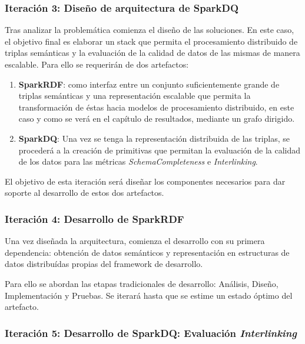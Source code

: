 

\subsubsection{Iteración 3: Diseño de arquitectura de SparkDQ}

Tras analizar la problemática comienza el diseño de las soluciones. En este
caso, el objetivo final es elaborar un stack que permita el procesamiento
distribuido de triplas semánticas y la evaluación de la calidad de datos de las
mismas de manera escalable. Para ello se requerirán de dos artefactos:

\begin{enumerate}
\item \textbf{SparkRDF}: como interfaz entre un conjunto suficientemente grande de
  triplas semánticas y una representación escalable que permita la
  transformación de éstas hacia modelos de procesamiento distribuido, en este
  caso y como se verá en el capítulo de resultados, mediante un grafo dirigido.
\item \textbf{SparkDQ}: Una vez se tenga la representación distribuida de las triplas, se
  procederá a la creación de primitivas que permitan la evaluación de la calidad
  de los datos para las métricas \textit{SchemaCompleteness} e \textit{Interlinking}.
\end{enumerate}


El objetivo de esta iteración será diseñar los componentes necesarios para dar
soporte al desarrollo de estos dos artefactos.



\subsubsection{Iteración 4: Desarrollo de SparkRDF}

Una vez diseñada la arquitectura, comienza el desarrollo con su primera
dependencia: obtención de datos semánticos y representación en estructuras de
datos distribuídas propias del framework de desarrollo.

Para ello se abordan las etapas tradicionales de desarrollo: Análisis, Diseño,
Implementación y Pruebas. Se iterará hasta que se estime un estado óptimo del
artefacto. 



\subsubsection{Iteración 5: Desarrollo de SparkDQ: Evaluación
  \textit{Interlinking}}

